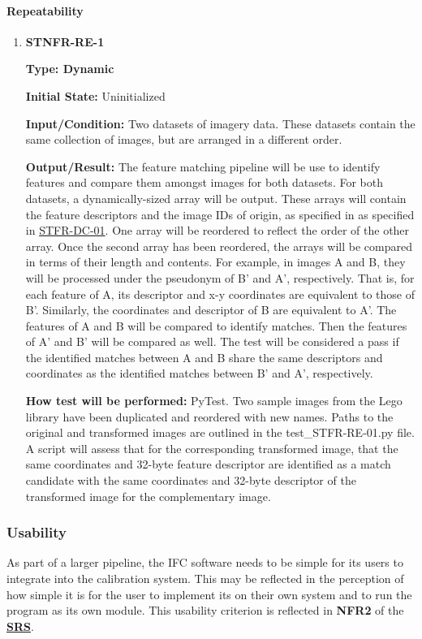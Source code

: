 \documentclass[12pt, titlepage]{article}
\begin{document}
\paragraph{Repeatability}
\begin{enumerate}
\item \hypertarget{STNFR-RE-1}{\textbf{STNFR-RE-1}\\}
\textbf{Type: Dynamic}

\textbf{Initial State:} Uninitialized

\textbf{Input/Condition:} Two datasets of imagery data. These datasets contain the same collection of images, 
but are arranged in a different order.

\textbf{Output/Result:} The feature matching pipeline will be use to identify features and compare them amongst 
images for both datasets. For both datasets, a dynamically-sized array will be output. These arrays will 
contain the feature descriptors and the image IDs of origin, as specified in as specified in 
\hyperlink{STFR-DC-01}{STFR-DC-01}. 
One array will be reordered to reflect the order of the other array. Once the second array has been reordered, 
the arrays will be compared in terms of their length and contents. For example, in images A and B, they will be 
processed under the pseudonym of B' and A', respectively. That is, for each feature of A, its descriptor and x-y 
coordinates are equivalent to those of B'. Similarly, the coordinates and descriptor of B are equivalent to A'. 
The features of A and B will be compared to identify matches. Then the features of A' and B' will be compared as 
well. The test will be considered a pass if the identified matches between A and B share the same descriptors and 
coordinates as the identified matches between B' and A', respectively.

\textbf{How test will be performed:} PyTest. Two sample images from the Lego library have been duplicated and reordered with new names. Paths to the original and transformed images are outlined in the  test\_STFR-RE-01.py file. A script will assess that for the corresponding transformed image, that the same coordinates and 32-byte feature descriptor are identified as a match candidate with the same coordinates and 32-byte descriptor of the transformed image for the complementary image.
\end{enumerate}

\subsubsection{Usability}
As part of a larger pipeline, the IFC software needs to be simple for its users to integrate into the calibration system. 
This may be reflected in the perception of how simple it is for the user to 
implement its on their own system and to run the program as its own module. This usability criterion is 
reflected in \textbf{NFR2} of the 
\textbf{\href{https://github.com/KiranSingh15/CAS-741-Image-Correspondences/blob/main/docs/SRS/SRS.pdf}
{SRS}}.
\end{document}
